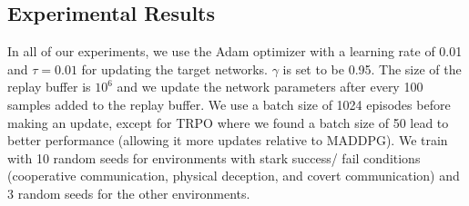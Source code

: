 \documentclass{article}
\newcommand{\cpol}[0]{\pmb{\mu}}
\begin{document}
\iffalse
\begin{algorithm}[H]
 \SetAlgoLined
  \begin{algorithmic}
    \FOR{$\textrm{episode}=1\textrm{ to }M$}
      \FOR{$t=1\textrm{ to max-episode-length}$}
          \STATE Select actions $a=(a_1,\ldots,a_N)$ w.r.t.\@ current policy, observe reward $r$ and new state $\mathbf{x}'$
          \STATE Store $(\mathbf{x},a,r,\mathbf{x}')$ in replay buffer $\mathcal{D}$ %
          \FOR{agent $i=1\textrm{ to }N$}
            \STATE Sample a random minibatch of $S$ samples $(\mathbf{x}^j,a^j,r^j,\mathbf{x}'^j)$ from $\mathcal{D}$
            \STATE Set $y^j=r_i^j+\gamma\, Q_i^{\cpol'}(\mathbf{x}'^j,a_1',\ldots,a_N')|_{a_k'=\cpol'_k(o_k^j)}$
            \STATE Update critic by minimizing the loss $\mathcal{L}(\theta_i)=\frac{1}{S}\sum_j\left(y^j-Q_i^{\cpol}(\mathbf{x}^j,a^j_1,\ldots,a^j_N)\right)^2$
            \STATE Update actor using the sampled policy gradient:
            $$
            \nabla_{\theta_i}J\approx\frac{1}{S}\sum_j\nabla_{\theta_i}\cpol_i(o_i^j)\nabla_{a_i}Q_i^{\cpol}(\mathbf{x}^j,a^j_1,\ldots,a_i,\ldots,a^j_N)\big|_{a_i=\cpol_i(o_i^j)}
            $$
          \ENDFOR     
          \STATE Update target network parameters for each agent $i$:
          $$
          \theta_i'\gets\tau\theta_i+(1-\tau)\theta_i'
          $$
      \ENDFOR
    \ENDFOR
  \end{algorithmic}
 \caption{Multi-Agent Deep Deterministic Policy Gradient for $N$ agents}
\end{algorithm}
\fi

\subsection*{Experimental Results}
\label{sec:tables}

In all of our experiments, we use the Adam optimizer with a learning rate of 0.01 and $\tau=0.01$ for updating the target networks. $\gamma$ is set to be 0.95. The size of the replay buffer is $10^6$ and we update the network parameters after every 100 samples added to the replay buffer. We use a batch size of 1024 episodes before making an update, except for TRPO where we found a batch size of 50 lead to better performance (allowing it more updates relative to MADDPG). We train with 10 random seeds for environments with stark success/ fail conditions (cooperative communication, physical deception, and covert communication) and 3 random seeds for the other environments.
\end{document}
